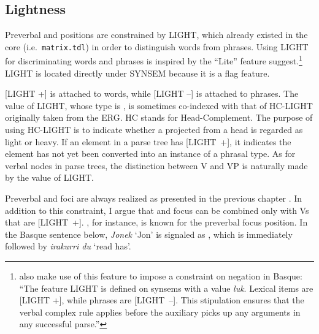 \subsection{Lightness}
\label{9:ssec:lightness}


Preverbal and   positions are constrained by
LIGHT, which already existed in the \lingo {} core (i.e.\ \texttt{matrix.tdl}) in order to distinguish
words from phrases. Using LIGHT for discriminating words
and phrases is inspired by the ``Lite'' feature
\citet{abeille:godard:01}
suggest.\footnote{\citet[p.\ 54]{crowgey:bender:11} also make use of
  this feature to impose a constraint on negation in
  Basque: ``The feature LIGHT is defined on synsems with
  a value \textit{luk}. Lexical items are [LIGHT +], while phrases are
  \mbox{[LIGHT --]}. This stipulation ensures that the verbal complex
  rule applies before the auxiliary picks up any arguments in any
  successful parse.''} LIGHT is located directly under
SYNSEM because it is a flag feature.


[LIGHT +] is attached to words, while [LIGHT --] is attached to
phrases. The value of LIGHT, whose type is , is sometimes
co-indexed with that of HC-LIGHT originally taken from the ERG. HC
stands for Head-Complement. The purpose of using HC-LIGHT is to
indicate whether a  projected from a head is
regarded as light or heavy. If an element in a parse tree has
\mbox{[LIGHT +]}, it indicates the element has not yet
been converted into an instance of a phrasal type. As for verbal nodes
in parse trees, the distinction between V and VP is naturally made by
the value of LIGHT.



Preverbal and  foci are always realized as
 presented in the previous
chapter . In addition to this
constraint, I argue that  and  focus
can be combined only with Vs that are \mbox{[LIGHT +]}.  ,
for instance, is known for the preverbal focus position.  In the
Basque sentence below, \textit{Jonek} `Jon' is signaled as
, which is immediately followed by \textit{irakurri du}
`read has'.








